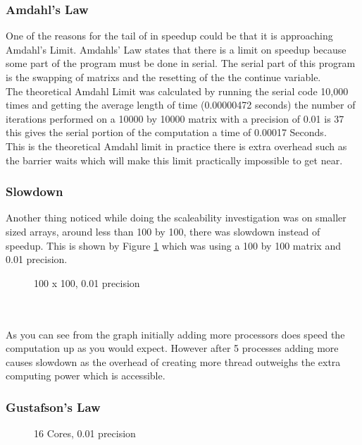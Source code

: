 \documentclass{article}
\begin{document}
 \subsubsection{Amdahl’s Law}
 One of the reasons for the tail of in speedup could be that it is approaching
 Amdahl's Limit. Amdahls' Law states that there is a limit on speedup because
 some part of the program must be done in serial. The serial part of this program
 is the swapping of matrixs and the resetting of the the continue variable.\\
 The theoretical Amdahl Limit was calculated by running the serial code 10,000
 times and getting the average length of time (0.00000472 seconds) the number of
 iterations performed on a 10000 by 10000 matrix with a precision of 0.01 is 37
 this gives the serial portion of the computation a time of 0.00017 Seconds.\\
 This is the theoretical Amdahl limit in practice there is extra overhead such
 as the barrier waits which will make this limit practically impossible to get near.

\subsubsection{Slowdown}

Another thing noticed while doing the scaleability investigation was on smaller
sized arrays, around less than 100 by 100, there was slowdown instead of speedup.
This is shown by Figure \ref{fig:slowdown} which was using a 100 by 100 matrix and 0.01
precision.

\begin{figure}[h!]
 \centering
 \caption{100 x 100, 0.01 precision}
 \label{fig:slowdown}
\end{figure}\\~\\

As you can see from the graph initially adding more processors does speed the
computation up as you would expect. However after 5 processes adding more causes
slowdown as the overhead of creating more thread outweighs the extra computing
power which is accessible.

\subsubsection{Gustafson’s Law}

\begin{figure}[h!]
 \centering
 \caption{16 Cores, 0.01 precision}
 \label{fig:gustafson}
\end{figure}\\~\\
\end{document}
